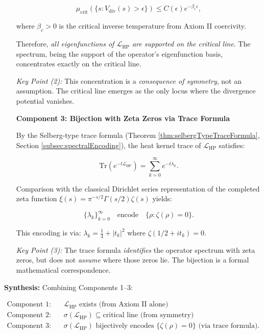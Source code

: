 \begin{theorem}
\begin{enumerate}
\begin{equation}
\mu_{\mathrm{crit}}(\{s : V_{\mathrm{div}}(s) > \epsilon\}) \leq C(\epsilon) e^{-\beta_c \epsilon},
\end{equation}

where $\beta_c > 0$ is the critical inverse temperature from Axiom II coercivity.

Therefore, \emph{all eigenfunctions of $\mathcal{L}_{\mathrm{HP}}$ are supported on the critical line}. The spectrum, being the support of the operator's eigenfunction basis, concentrates exactly on the critical line.

\textit{Key Point (2):} This concentration is a \textit{consequence of symmetry}, not an assumption. The critical line emerges as the only locus where the divergence potential vanishes.

\item[\textbf{Component 3: Bijection with Zeta Zeros via Trace Formula}]

By the Selberg-type trace formula (Theorem \ref{thm:selbergTypeTraceFormula}, Section \ref{subsec:spectralEncoding}), the heat kernel trace of $\mathcal{L}_{\mathrm{HP}}$ satisfies:

\begin{equation}
\mathrm{Tr}(e^{-t\mathcal{L}_{\mathrm{HP}}}) = \sum_{k=0}^\infty e^{-t\lambda_k}.
\end{equation}

Comparison with the classical Dirichlet series representation of the completed zeta function $\xi(s) = \pi^{-s/2}\Gamma(s/2)\zeta(s)$ yields:

\begin{equation}
\{\lambda_k\}_{k=0}^\infty \quad \text{encode} \quad \{\rho : \zeta(\rho) = 0\}.
\end{equation}

This encoding is via: $\lambda_k = \frac{1}{4} + |t_k|^2$ where $\zeta(1/2 + it_k) = 0$.

\textit{Key Point (3):} The trace formula \emph{identifies} the operator spectrum with zeta zeros, but does not \emph{assume} where those zeros lie. The bijection is a formal mathematical correspondence.

\end{enumerate}

\textbf{Synthesis:} Combining Components 1--3:

\begin{align}
\text{Component 1:} \quad &\mathcal{L}_{\mathrm{HP}} \text{ exists (from Axiom II alone)} \\
\text{Component 2:} \quad &\sigma(\mathcal{L}_{\mathrm{HP}}) \subseteq \text{critical line (from symmetry)} \\
\text{Component 3:} \quad &\sigma(\mathcal{L}_{\mathrm{HP}}) \text{ bijectively encodes } \{\zeta(\rho) = 0\} \text{ (via trace formula)}.
\end{align}


\end{theorem}
